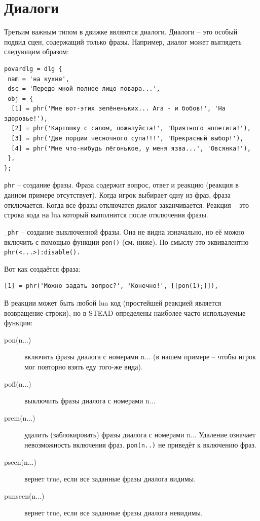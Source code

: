 \documentclass[a4paper,12pt]{article}
\begin{document}
\section{Диалоги}


Третьим важным типом в движке являются диалоги. Диалоги -- это особый подвид сцен, содержащий только фразы. Например, диалог может выглядеть следующим образом:

\begin{verbatim}
povardlg = dlg {
 nam = 'на кухне',
 dsc = 'Передо мной полное лицо повара...',
 obj = {
  [1] = phr('Мне вот-этих зелёненьких... Ага - и бобов!', 'На здоровье!'),
  [2] = phr('Картошку с салом, пожалуйста!', 'Приятного аппетита!'),
  [3] = phr('Две порции чесночного супа!!!', 'Прекрасный выбор!'),
  [4] = phr('Мне что-нибудь лёгонькое, у меня язва...', 'Овсянка!'),
 },
};
\end{verbatim}

\verb/phr/ -- создание фразы. Фраза содержит вопрос, ответ и реакцию (реакция в данном примере отсутствует). Когда игрок выбирает одну из фраз, фраза отключается. Когда все фразы отключатся диалог заканчивается. Реакция -- это строка кода на lua который выполнится после отключения фразы.

\verb/_phr/ -- создание выключенной фразы. Она не видна изначально, но её можно включить с помощью функции \verb/pon()/ (см. ниже). По смыслу это эквивалентно \verb/phr(<...>):disable()./

Вот как создаётся фраза:

\begin{verbatim}
[1] = phr('Можно задать вопрос?', 'Конечно!', [[pon(1);]]),
\end{verbatim}

В реакции может быть любой lua код (простейшей реакцией является возвращение строки), но в STEAD определены наиболее часто используемые функции:

\begin{description}
\item[pon(n...)] включить фразы диалога с номерами n... (в нашем примере -- чтобы игрок мог повторно взять еду того-же вида).
\item[poff(n...)] выключить фразы диалога с номерами n...
\item[prem(n...)] удалить (заблокировать) фразы диалога с номерами n... Удаление означает невозможность включения фраз. \verb/pon(n..)/ не приведёт к включению фраз.
\item[pseen(n...)] вернет true, если все заданные фразы диалога видимы.
\item[punseen(n...)] вернет true, если все заданные фразы диалога невидимы.
\end{description}
\end{document}
